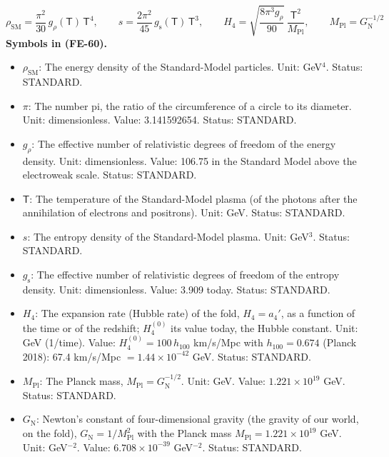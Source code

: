 \documentclass[
  10pt,
]{article}
\providecommand{\tightlist}{%
  \setlength{\itemsep}{0pt}\setlength{\parskip}{0pt}}
\begin{document}
\[
\rho_{\mathrm{SM}} = \frac{\pi^2}{30}\,g_\rho(\mathsf{T})\,\mathsf{T}^4,\qquad s = \frac{2\pi^2}{45}\,g_{\mathrm{s}}(\mathsf{T})\,\mathsf{T}^3,\qquad
H_4 = \sqrt{\frac{8\pi^3g_\rho}{90}}\,\frac{\mathsf{T}^2}{M_{\mathrm{Pl}}},\qquad M_{\mathrm{Pl}} = G_{\mathrm{N}}^{-1/2} \tag{FE-60}
\] \textbf{Symbols in (FE-60).}

\begin{itemize}
\tightlist
\item
  \(\rho_{\mathrm{SM}}\): The energy density of the Standard-Model
  particles. Unit: GeV\(^4\). Status: STANDARD.
\item
  \(\pi\): The number pi, the ratio of the circumference of a circle to
  its diameter. Unit: dimensionless. Value: 3.141592654. Status:
  STANDARD.
\item
  \(g_\rho\): The effective number of relativistic degrees of freedom of
  the energy density. Unit: dimensionless. Value: 106.75 in the Standard
  Model above the electroweak scale. Status: STANDARD.
\item
  \(\mathsf{T}\): The temperature of the Standard-Model plasma (of the
  photons after the annihilation of electrons and positrons). Unit: GeV.
  Status: STANDARD.
\item
  \(s\): The entropy density of the Standard-Model plasma. Unit:
  GeV\(^3\). Status: STANDARD.
\item
  \(g_{\mathrm{s}}\): The effective number of relativistic degrees of
  freedom of the entropy density. Unit: dimensionless. Value: 3.909
  today. Status: STANDARD.
\item
  \(H_4\): The expansion rate (Hubble rate) of the fold, \(H_4 = a_4'\),
  as a function of the time or of the redshift; \(H_4^{(0)}\) its value
  today, the Hubble constant. Unit: GeV (1/time). Value:
  \(H_4^{(0)} = 100\,h_{100}\) km/s/Mpc with \(h_{100} = 0.674\) (Planck
  2018): 67.4 km/s/Mpc \(= 1.44\times10^{-42}\) GeV. Status: STANDARD.
\item
  \(M_{\mathrm{Pl}}\): The Planck mass,
  \(M_{\mathrm{Pl}} = G_{\mathrm{N}}^{-1/2}\). Unit: GeV. Value:
  \(1.221\times10^{19}\) GeV. Status: STANDARD.
\item
  \(G_{\mathrm{N}}\): Newton's constant of four-dimensional gravity (the
  gravity of our world, on the fold),
  \(G_{\mathrm{N}} = 1/M_{\mathrm{Pl}}^2\) with the Planck mass
  \(M_{\mathrm{Pl}} = 1.221\times10^{19}\) GeV. Unit: GeV\(^{-2}\).
  Value: \(6.708\times10^{-39}\) GeV\(^{-2}\). Status: STANDARD.
\end{itemize}
\end{document}
